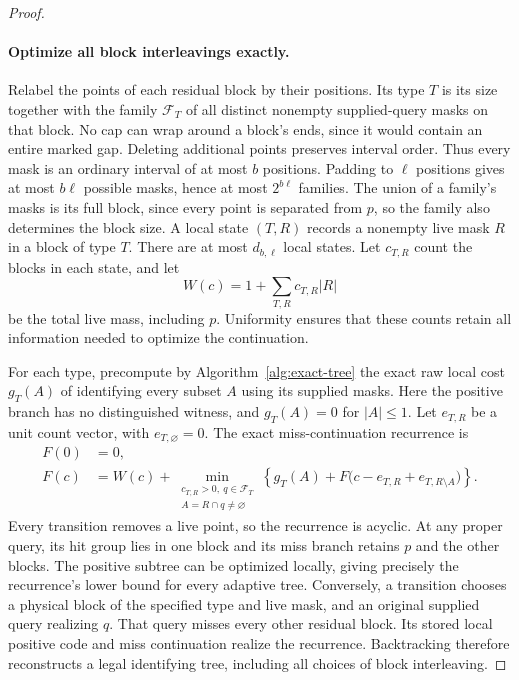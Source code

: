 \begin{proof}
\paragraph{Optimize all block interleavings exactly.}
Relabel the points of each residual block by their positions. Its
type $T$ is its size together with the family $\mathcal F_T$ of all
distinct nonempty supplied-query masks on that block. No cap can
wrap around a block's ends, since it would contain an entire marked
gap. Deleting additional points preserves interval order. Thus every
mask is an ordinary interval of at most $b$ positions. Padding to
$\ell$ positions gives at most $b\ell$ possible masks, hence at most
$2^{b\ell}$ families. The union of a family's masks is its full block,
since every point is separated from $p$, so the family also determines
the block size. A local
state $(T,R)$ records a nonempty live mask $R$ in a block of type $T$.
There are at most $d_{b,\ell}$ local states. Let $c_{T,R}$ count the
blocks in each state, and let
\[
 W(c)=1+\sum_{T,R}c_{T,R}|R|
\]
be the total live mass, including $p$. Uniformity ensures that these
counts retain all information needed to optimize the continuation.

For each type, precompute by Algorithm~\ref{alg:exact-tree} the exact
raw local cost $g_T(A)$ of identifying every subset $A$ using its
supplied masks. Here the positive branch has no distinguished
witness, and $g_T(A)=0$ for $|A|\le1$. Let $e_{T,R}$ be a unit count
vector, with $e_{T,\varnothing}=0$. The exact miss-continuation
recurrence is
\begin{equation}\label{eq:uniform-cap-count-dp}
 \begin{aligned}
 F(0)&=0,\\
 F(c)&=W(c)+\min_{\substack{c_{T,R}>0,\ q\in\mathcal F_T\\
                          A=R\cap q\ne\varnothing}}
 \left\{g_T(A)+F\bigl(c-e_{T,R}+e_{T,R\setminus A}\bigr)\right\}.
 \end{aligned}
\end{equation}
Every transition removes a live point, so the recurrence is acyclic.
At any proper query, its hit group lies in one block and its miss
branch retains $p$ and the other blocks. The positive subtree can be
optimized locally, giving precisely the recurrence's lower bound
for every adaptive tree. Conversely, a transition chooses a physical
block of the specified type and live mask, and an original supplied
query realizing $q$. That query misses every other residual block.
Its stored local positive code and miss continuation realize the
recurrence. Backtracking therefore reconstructs a legal identifying
tree, including all choices of block interleaving.


\end{proof}
